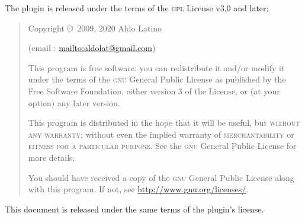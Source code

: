 	\noindent The plugin is released under the terms of the \textsc{gpl} License
	v3.0 and later:

	\begin{quote}
		\begin{center}
			Copyright \copyright~2009, 2020  Aldo Latino

			(email : \url{mailto:aldolat@gmail.com})
		\end{center}
		This program is free software: you can redistribute it and/or modify it
		under the terms of the \textsc{gnu} General Public License as published by
		the Free Software Foundation, either version 3 of the License, or (at your
		option) any later version.

		This program is distributed in the hope that it will be useful, but
		\textsc{without any warranty}; without even the implied warranty of
		\textsc{merchantability} or \textsc{fitness for a particular purpose}.  See
		the \textsc{gnu} General Public License for more details.

		You should have received a copy of the \textsc{gnu} General Public License
		along with this program. If not, see \url{http://www.gnu.org/licenses/}.
	\end{quote}

	\noindent This document is released under the same terms of the plugin's
	license.
\endgroup